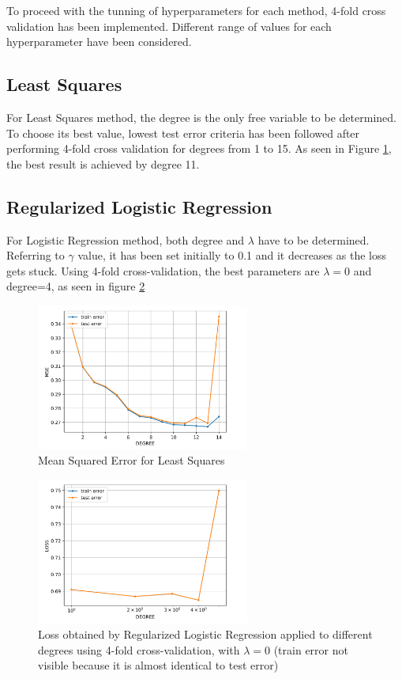 \documentclass[10pt,conference]{IEEEtran}
\begin{document}
To proceed with the tunning of hyperparameters for each method, 4-fold cross validation has been implemented. Different range of values for each hyperparameter have been considered. 

\subsection{Least Squares}
For Least Squares method, the degree is the only free variable to be determined. To choose its best value, lowest test error criteria has been followed after performing 4-fold cross validation for degrees from 1 to 15. 
As seen in Figure \ref{figure 3}, the best result is achieved by degree 11.

\subsection{Regularized Logistic Regression}
For Logistic Regression method, both degree and $\lambda$ have to be determined. Referring to $\gamma$ value, it has been set initially to 0.1 and it decreases as the loss gets stuck. Using 4-fold cross-validation, the best parameters are $\lambda= 0$ and degree=4, as seen in figure \ref{figure 4}

\begin{figure}[ht!]
	\centering
	\includegraphics[width=265px]{cross_validation_LS_degress_std.png}
	\caption{Mean Squared Error for Least Squares}
\label{figure 3}
\end{figure}

\begin{figure}[ht!]
	\centering
	\includegraphics[width=265px]{Reg_Logistic_Regression.png}
	\caption{Loss obtained by Regularized Logistic Regression applied to different degrees using 4-fold cross-validation, with $\lambda=0$ (train error not visible because it is almost identical to test error)}
    \label{figure 4}
\end{figure}
 
\end{document}
